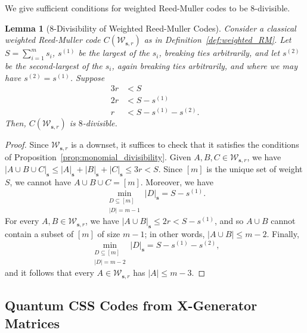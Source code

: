 \documentclass{article}
\newcounter{main}[section]
\newtheorem{lemma}[main]{Lemma}
\begin{document}
We give sufficient conditions for weighted Reed-Muller codes to be $8$-divisible.
\begin{lemma}[$8$-Divisibility of Weighted Reed-Muller Codes]\label{lem:divis_weighted_RM}
    Consider a classical weighted Reed-Muller code $C(\mathcal{W}_{\boldsymbol{s},r})$ as in Definition~\ref{def:weighted_RM}. Let $S = \sum_{i=1}^ms_i$, $s^{(1)}$ be the largest of the $s_i$, breaking ties arbitrarily, and let $s^{(2)}$ be the second-largest of the $s_i$, again breaking ties arbitrarily, and where we may have $s^{(2)} = s^{(1)}$. Suppose
    \begin{align}
        3r &< S\\
        2r &< S-s^{(1)}\\
        r &< S-s^{(1)}-s^{(2)}.
    \end{align}
    Then, $C(\mathcal{W}_{\boldsymbol{s},r})$ is $8$-divisible.
\end{lemma}
\begin{proof}
    Since $\mathcal{W}_{\boldsymbol{s},r}$ is a downset, it suffices to check that it satisfies the conditions of Proposition~\ref{prop:monomial_divisibility}. Given $A,B,C \in \mathcal{W}_{\boldsymbol{s},r}$, we have $|A\cup B \cup C|_{\boldsymbol{s}} \leq |A|_{\boldsymbol{s}} + |B|_{\boldsymbol{s}} + |C|_{\boldsymbol{s}} \leq 3r < S$. Since $[m]$ is the unique set of weight $S$, we cannot have $A \cup B \cup C = [m]$. Moreover, we have
    \begin{equation}
        \min_{\substack{D \subseteq [m]\\|D| = m-1}}|D|_{\boldsymbol{s}} = S-s^{(1)}.
    \end{equation}
    For every $A,B \in \mathcal{W}_{\boldsymbol{s},r}$, we have $|A\cup B|_{\boldsymbol{s}} \leq 2r < S-s^{(1)}$, and so $A \cup B$ cannot contain a subset of $[m]$ of size $m-1$; in other words, $|A \cup B| \leq m-2$. Finally,
    \begin{equation}
        \min_{\substack{D \subseteq [m]\\|D| = m-2}} |D|_{\boldsymbol{s}} = S-s^{(1)}-s^{(2)},
    \end{equation}
    and it follows that every $A \in \mathcal{W}_{\boldsymbol{s},r}$ has $|A| \leq m-3$.
\end{proof}



\subsection{Quantum CSS Codes from X-Generator Matrices}\label{subsec:prelims_X_gen}
\end{document}

